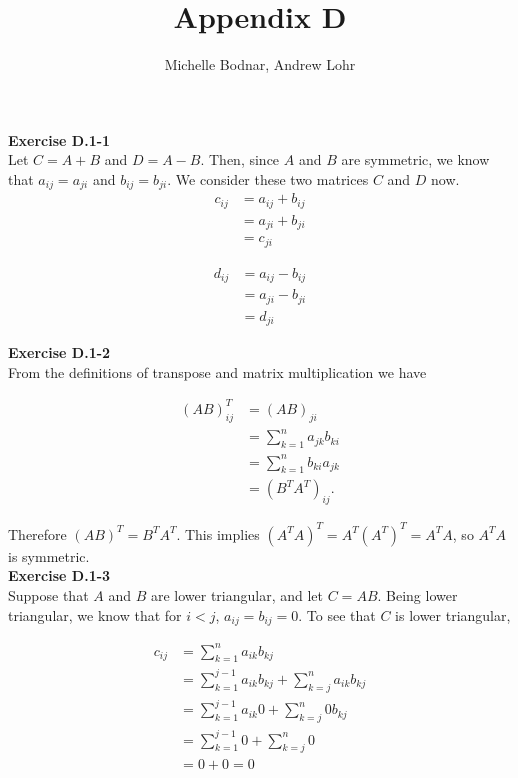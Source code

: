 \documentclass{article}
\title{Appendix D}
\author{Michelle Bodnar, Andrew Lohr}
\begin{document}
\maketitle

\noindent\textbf{Exercise D.1-1}\\

Let $C = A+B$ and $D = A-B$. Then, since $A$ and $B$ are symmetric, we know that $a_{ij} = a_{ji}$ and $b_{ij} =b_{ji}$. We consider these two matrices $C$ and $D$ now.
\begin{align*}
c_{ij} &= a_{ij} + b_{ij}\\
&=a_{ji} + b_{ji}\\
&= c_{ji}
\end{align*}

\begin{align*}
d_{ij} &= a_{ij} - b_{ij}\\
&=a_{ji} - b_{ji}\\
&= d_{ji}
\end{align*}


\noindent\textbf{Exercise D.1-2}\\

From the definitions of transpose and matrix multiplication we have

\begin{align*}
(AB)^T_{ij} &= (AB)_{ji} \\
&= \sum_{k=1}^n a_{jk}b_{ki}\\
&= \sum_{k=1}^n b_{ki}a_{jk}\\
&= (B^TA^T)_{ij}.
\end{align*}

Therefore $(AB)^T = B^TA^T$.  This implies $(A^TA)^T = A^T(A^T)^T = A^TA$, so $A^TA$ is symmetric. \\

\noindent\textbf{Exercise D.1-3}\\

Suppose that $A$ and $B$ are lower triangular, and let $C= AB$. Being lower triangular, we know that for $i<j$, $a_{ij} = b_{ij} = 0$. To see that $C$ is lower triangular,

\begin{align*}
c_{ij} &= \sum_{k=1}^n a_{ik} b_{kj}\\
&= \sum_{k=1}^{j-1} a_{ik}b_{kj} + \sum_{k=j}^n a_{ik}b_{kj}\\
&= \sum_{k=1}^{j-1} a_{ik}0 + \sum_{k=j}^n 0b_{kj}\\
&= \sum_{k=1}^{j-1} 0 + \sum_{k=j}^n 0\\
&= 0+ 0=0
\end{align*}
\end{document}
